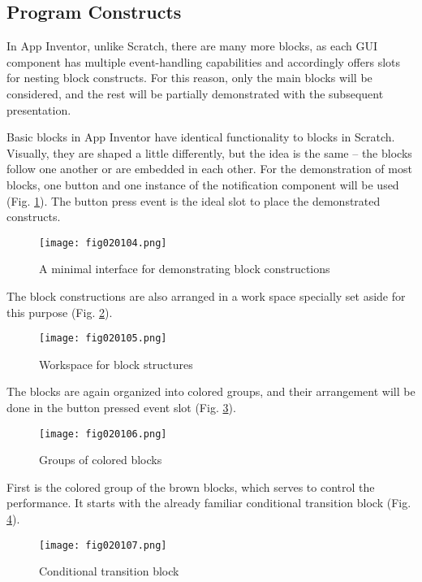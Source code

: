 \subsection{Program Constructs}

In App Inventor, unlike Scratch, there are many more blocks, as each GUI component has multiple event-handling capabilities and accordingly offers slots for nesting block constructs. For this reason, only the main blocks will be considered, and the rest will be partially demonstrated with the subsequent presentation.

Basic blocks in App Inventor have identical functionality to blocks in Scratch. Visually, they are shaped a little differently, but the idea is the same – the blocks follow one another or are embedded in each other. For the demonstration of most blocks, one button and one instance of the notification component will be used (Fig. \ref{fig020104}). The button press event is the ideal slot to place the demonstrated constructs.

\begin{figure}[H]
   \centering
   \texttt{[image: fig020104.png]}
   \caption{A minimal interface for demonstrating block constructions}
\label{fig020104}
\end{figure}

The block constructions are also arranged in a work space specially set aside for this purpose (Fig. \ref{fig020105}).

\begin{figure}[H]
   \centering
   \texttt{[image: fig020105.png]}
   \caption{Workspace for block structures}
\label{fig020105}
\end{figure}

The blocks are again organized into colored groups, and their arrangement will be done in the button pressed event slot (Fig. \ref{fig020106}).

\begin{figure}[H]
   \centering
   \texttt{[image: fig020106.png]}
   \caption{Groups of colored blocks}
\label{fig020106}
\end{figure}

First is the colored group of the brown blocks, which serves to control the performance. It starts with the already familiar conditional transition block (Fig. \ref{fig020107}).

\begin{figure}[H]
   \centering
   \texttt{[image: fig020107.png]}
   \caption{Conditional transition block}
\label{fig020107}
\end{figure}

